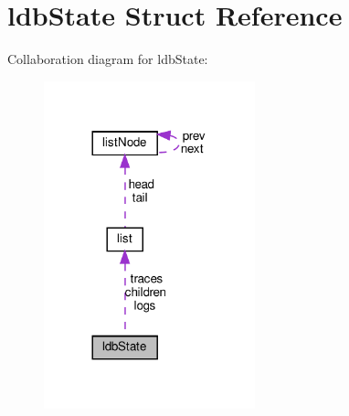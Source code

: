\hypertarget{structldb_state}{}\section{ldb\+State Struct Reference}
\label{structldb_state}


Collaboration diagram for ldb\+State\+:
\nopagebreak
\begin{figure}[H]
\begin{center}
\leavevmode
\includegraphics[width=173pt]{structldb_state__coll__graph}
\end{center}
\end{figure}
